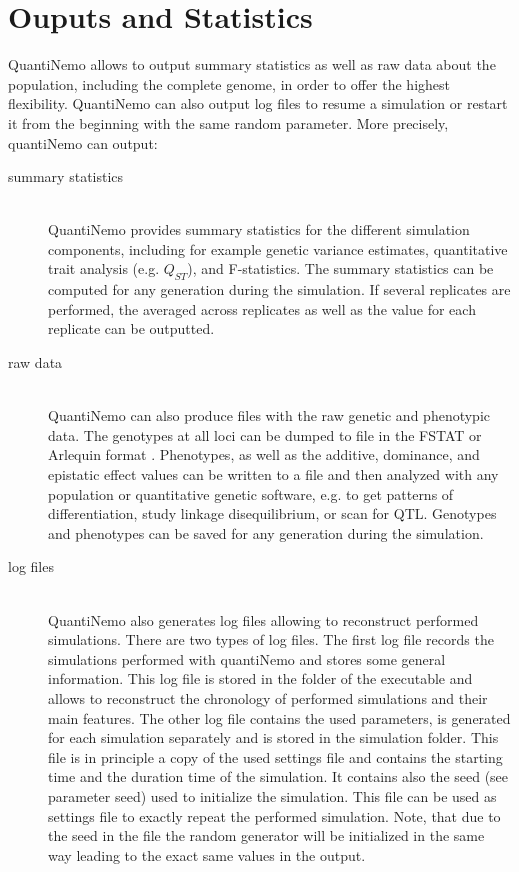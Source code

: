 \documentclass[letterpaper,12pt,oneside]{book}
\begin{document}
\chapter{Ouputs and Statistics}
\label{chap:OutputsAndStatistics}
QuantiNemo allows to output summary statistics as well as raw data about the population, including the complete genome, in order to offer the highest flexibility. QuantiNemo can also output log files to resume a simulation or restart it from the beginning with the same random parameter. More precisely, quantiNemo can output:
\begin{description}
\item[summary statistics]\hspace*{\fill}\\
QuantiNemo provides summary statistics for the different simulation components, including for example genetic variance estimates, quantitative trait analysis (e.g. $Q_{ST}$), and F-statistics. The summary statistics can be computed for any generation during the simulation. If several replicates are performed, the averaged across replicates as well as the value for each replicate can be outputted. 

\item[raw data]\hspace*{\fill}\\
QuantiNemo can also produce files with the raw genetic and phenotypic data. The genotypes at all loci can be dumped to file in the FSTAT  \citep{Goudet_1995} or Arlequin format \citep{Excoffier_2010}. Phenotypes, as well as the additive, dominance, and epistatic effect values can be written to a file and then analyzed with any population or quantitative genetic software, e.g. to get patterns of differentiation, study linkage disequilibrium, or scan for QTL. Genotypes and phenotypes can be saved for any generation during the simulation.

\item[log files]\hspace*{\fill}\\
QuantiNemo also generates log files allowing to reconstruct performed simulations. There are two types of log files. The first log file records the simulations performed with quantiNemo and stores some general information. This log file is stored in the folder of the executable and allows to reconstruct the chronology of performed simulations and their main features. The other log file contains the used parameters, is generated for each simulation separately and is stored in the simulation folder. This file is in principle a copy of the used settings file and contains the starting time and the duration time of the simulation. It contains also the seed (see parameter \textsf{seed}) used to initialize the simulation. This file can be used as settings file to exactly repeat the performed simulation. Note, that due to the seed in the file the random generator will be initialized in the same way leading to the exact same values in the output.
\end{description}
\end{document}
